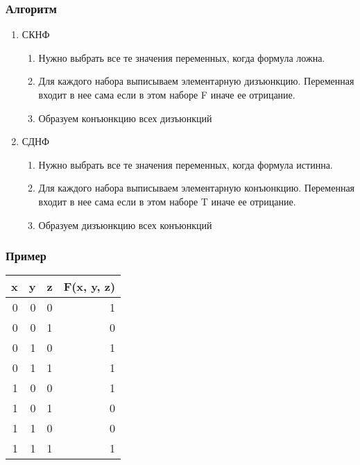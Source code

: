 \documentclass[letterpaper]{article}
\begin{document}
\subsubsection{Алгоритм}
\label{sec:org82d117a}
\begin{enumerate}
\item СКНФ
\label{sec:org5de8358}
\begin{enumerate}
\item Нужно выбрать все те значения переменных, когда формула ложна.\\
\item Для каждого набора выписываем элементарную дизъюнкцию. Переменная входит в нее сама если в этом наборе F иначе ее отрицание.\\
\item Образуем конъюнкцию всех дизъюнкций\\
\end{enumerate}
\item СДНФ
\label{sec:orgae02e5d}
\begin{enumerate}
\item Нужно выбрать все те значения переменных, когда формула истинна.\\
\item Для каждого набора выписываем элементарную конъюнкцию. Переменная входит в нее сама если в этом наборе T иначе ее отрицание.\\
\item Образуем дизъюнкцию всех конъюнкций\\
\end{enumerate}
\end{enumerate}
\subsubsection{Пример}
\label{sec:org8125624}
\begin{center}
\begin{tabular}{rrrr}
x & y & z & F(x, y, z)\\
\hline
0 & 0 & 0 & 1\\
0 & 0 & 1 & 0\\
0 & 1 & 0 & 1\\
0 & 1 & 1 & 1\\
1 & 0 & 0 & 1\\
1 & 0 & 1 & 0\\
1 & 1 & 0 & 0\\
1 & 1 & 1 & 1\\
\end{tabular}
\end{center}
\end{document}
